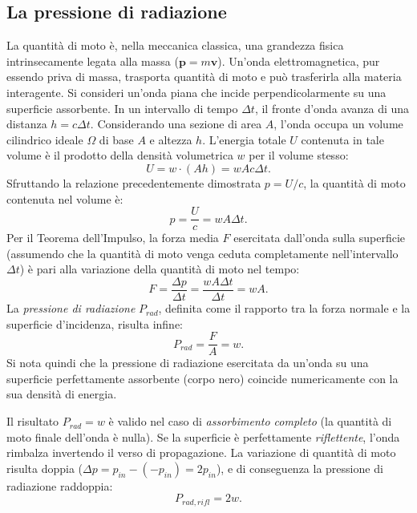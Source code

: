 \documentclass[a4paper,11pt]{report}
\begin{document}
\subsection{La pressione di radiazione}
La quantità di moto è, nella meccanica classica, una grandezza fisica intrinsecamente legata alla massa ($\bm{p} = m\bm{v}$). Un'onda elettromagnetica, pur essendo priva di massa, trasporta quantità di moto e può trasferirla alla materia interagente.
Si consideri un'onda piana che incide perpendicolarmente su una superficie assorbente. In un intervallo di tempo $\Delta t$, il fronte d'onda avanza di una distanza $h = c \Delta t$. Considerando una sezione di area $A$, l'onda occupa un volume cilindrico ideale $\Omega$ di base $A$ e altezza $h$.
L'energia totale $U$ contenuta in tale volume è il prodotto della densità volumetrica $w$ per il volume stesso:
\begin{equation}
U = w \cdot (A h) = w A c \Delta t.
\end{equation}
Sfruttando la relazione precedentemente dimostrata $p = U/c$, la quantità di moto contenuta nel volume è:
\begin{equation}
p = \frac{U}{c} = w A \Delta t.
\end{equation}
Per il Teorema dell'Impulso, la forza media $F$ esercitata dall'onda sulla superficie (assumendo che la quantità di moto venga ceduta completamente nell'intervallo $\Delta t$) è pari alla variazione della quantità di moto nel tempo:
\begin{equation}
F = \frac{\Delta p}{\Delta t} = \frac{w A \Delta t}{\Delta t} = wA.
\end{equation}
La \textit{pressione di radiazione} $P_{rad}$, definita come il rapporto tra la forza normale e la superficie d'incidenza, risulta infine:
\begin{equation}
P_{rad} = \frac{F}{A} = w.
\end{equation}
Si nota quindi che la pressione di radiazione esercitata da un'onda su una superficie perfettamente assorbente (corpo nero) coincide numericamente con la sua densità di energia.

\begin{approfondimento}[
    colback=white,
    colframe=gray!50!black,
    boxed title style={colback=gray!50!black, frame hidden, sharp corners},
    title={Nota su assorbimento e riflessione}
]
Il risultato $P_{rad} = w$ è valido nel caso di \textit{assorbimento completo} (la quantità di moto finale dell'onda è nulla).
Se la superficie è perfettamente \textit{riflettente}, l'onda rimbalza invertendo il verso di propagazione. La variazione di quantità di moto risulta doppia ($\Delta p = p_{in} - (-p_{in}) = 2p_{in}$), e di conseguenza la pressione di radiazione raddoppia:
\[ P_{rad, rifl} = 2w. \]
\end{approfondimento}
\end{document}
